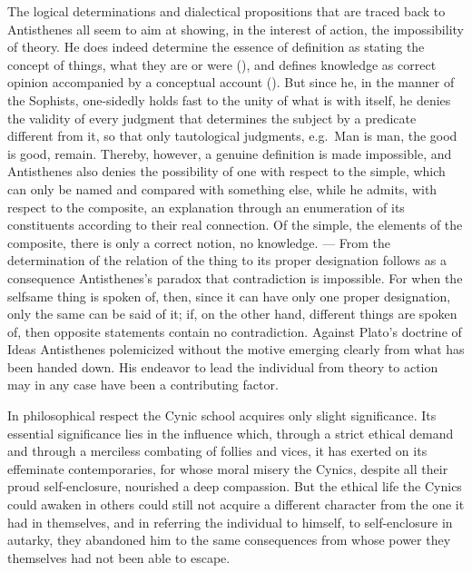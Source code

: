 The logical determinations and dialectical propositions that
are traced back to Antisthenes all seem to aim at showing, in
the interest of action, the impossibility of theory. He does indeed determine the essence of definition as stating the
concept of things, what they are or were (), and defines
knowledge as correct opinion accompanied by a conceptual account (). But since he, in
the manner of the Sophists, one-sidedly holds fast to the unity of what is with
itself, he denies the validity of every judgment that determines the subject by a predicate different from it, so that
only tautological judgments, e.g.\ Man is man,
the good is good, remain. Thereby, however, a genuine definition is made impossible, and Antisthenes also denies
the possibility of one with respect to the simple, which
can only be named and compared with something else, while he
admits, with respect to the composite, an explanation
through an enumeration of its constituents according to their real
connection. Of the simple, the elements of the composite,
there is only a correct notion, no knowledge. --- From the determination of the relation of the thing to its proper designation
follows as a consequence Antisthenes's paradox that contradiction
is impossible. For when the selfsame thing is spoken of, then,
since it can have only one proper designation, only
the same can be said of it; if, on the other hand, different
things are spoken of, then opposite statements contain no contradiction. Against
Plato's doctrine of Ideas Antisthenes polemicized without the motive
emerging clearly from what has been handed down. His endeavor
to lead the individual from theory to action may in any
case have been a contributing factor.

In philosophical respect the Cynic school acquires only
slight significance. Its essential significance lies in the
influence which, through a strict ethical demand and through a merciless combating of follies and vices, it has
exerted on its effeminate contemporaries, for whose moral misery the Cynics, despite all their proud self-enclosure, nourished a deep
compassion. But the ethical life the Cynics could awaken in
others could still not acquire a different character from the one it had
in themselves, and in referring the individual to himself, to
self-enclosure in autarky, they abandoned him to the same
consequences from whose power they themselves had not been able to escape.

